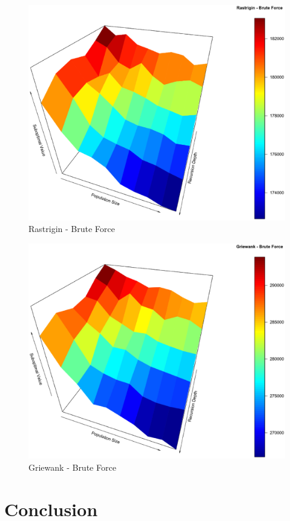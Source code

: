 \documentclass[conference]{IEEEtran}
\begin{document}
\begin{figure}[tbp]
\centering
\includegraphics[width=1.0\hsize]{fig27.eps}
\caption{Rastrigin - Brute Force}
\label{fig09}
\end{figure}

\begin{figure}[tbp]
\centering
\includegraphics[width=1.0\hsize]{fig30.eps}
\caption{Griewank - Brute Force}
\label{fig10}
\end{figure}

\section{Conclusion}
\end{document}
